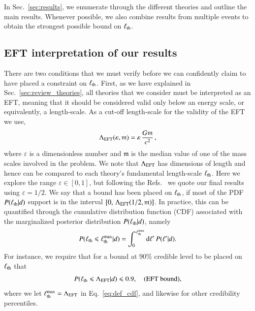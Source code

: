 \documentclass[twocolumn,
               prd,
               aps,
               superscriptaddress,
               tightenlines,
               nofootinbib,
               eqsecnum,
               amsfonts,
               amsmath,
               longbibliography]{revtex4-1}
\newcommand{\dd}{{\rm d}}
\newcommand{\hs}[1]{{\textcolor{TealBlue}{{#1}}}}
\begin{document}
In Sec.~\ref{sec:results}, we enumerate through the different theories and
outline the main results. Whenever possible, we also combine results from
multiple events to obtain the strongest possible bound on $\ell_{\rm th}$.

\subsection{EFT interpretation of our results}
\label{sec:remarks}

There are two conditions that we must verify before we can confidently claim to
have placed a constraint on $\ell_{\rm th}$. First, as we have explained in Sec.~\ref{sec:review_theories}, all theories that we
consider must be interpreted as an EFT, meaning that it should be
considered valid only below an energy scale, or equivalently, a length-scale.
%
As a cut-off length-scale for the validity of the EFT we use,
%
\begin{equation}
\Lambda_{\rm EFT} (\varepsilon, \mathfrak{m}) = \varepsilon \, \frac{G \mathfrak{m}}{c^2} \,,
\label{eq:def_cutoff}
\end{equation}
%
where $\varepsilon$ is a dimensionless number and $\mathfrak{m}$ is the median
value of one of the mass scales involved in the problem.
%
We note that $\Lambda_{\rm EFT}$ has dimensions of length and hence can be compared to \hs{each theory's fundamental length-scale} $\ell_{\rm th}$.
%
Here we explore the range $\varepsilon \in [0, 1]$, but following
the Refs.~\cite{Nair:2019iur,Perkins:2021mhb,Lyu:2022gdr} we quote our final results using
$\varepsilon = 1/2$.
We say that a bound has been placed on $\ell_{\rm th}$, if most of the PDF $P(\ell_{\rm th} | d)$ support is in the interval
$[0, \, \Lambda_{\rm EFT}(1/2, \mathfrak{m})]$.
%
In practice, this can be quantified through the cumulative distribution function
(CDF) associated with the marginalized posterior distribution $P(\ell_{\rm th} | d)$, namely
%
\begin{equation}
P(\ell_{\rm th} \leqslant \ell^{\rm max}_{\rm th} | d) = \int_{0}^{\,\ell^{\rm max}_{\rm th}} \dd \ell'\, P(\ell' | d).
\label{eq:def_cdf}
\end{equation}
%
For instance, we require that for a bound at 90\% credible level to be placed on $\ell_{\rm th}$ that
%
\begin{equation}
P(\ell_{\rm th} \leqslant \Lambda_{\rm EFT} | d) \leqslant 0.9,
\quad \textrm{(EFT bound)},
\label{eq:eft_bound}
\end{equation}
%
where we let $\ell^{\rm max}_{\rm th} = \Lambda_{\rm EFT}$ in Eq.~\eqref{eq:def_cdf}, and
likewise for other credibility percentiles.
\end{document}

